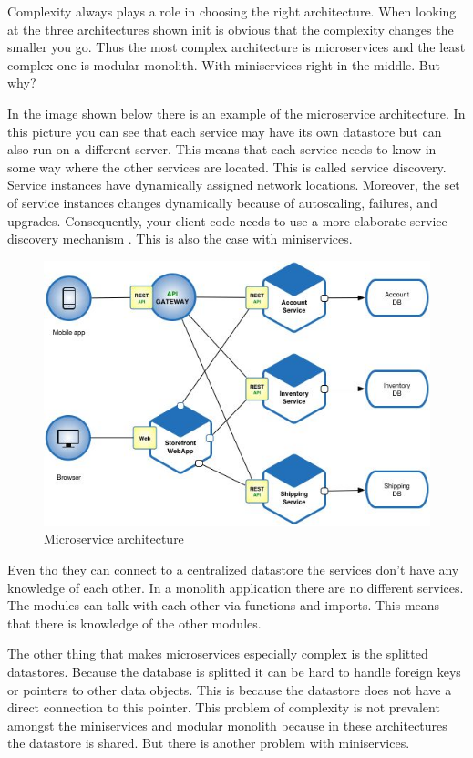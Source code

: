 Complexity always plays a role in choosing the right architecture. When looking at the three architectures shown  init is obvious that the complexity changes the smaller you go. Thus the most complex architecture is microservices and the least complex one is modular monolith. With miniservices right in the middle. But why?

In the image shown below there is an example of the microservice architecture. In this picture you can see that each service may have its own datastore but can also run on a different server. This means that each service needs to know in some way where the other services are located. This is called service discovery. Service instances have dynamically assigned network locations. Moreover, the set of service instances changes dynamically because of autoscaling, failures, and upgrades. Consequently, your client code needs to use a more elaborate service discovery mechanism \cite{serviceDiscovery}. This is also the case with miniservices.

\begin{figure}[H]
	\includegraphics[width=\linewidth]{microservice-architecture.png}
	\caption{Microservice architecture}
\end{figure}

Even tho they can connect to a centralized datastore the services don’t have any knowledge of each other. In a monolith application there are no different services. The modules can talk with each other via functions and imports. This means that there is knowledge of the other modules.

The other thing that makes microservices especially complex is the splitted datastores. Because the database is splitted it can be hard to handle foreign keys or pointers to other data objects. This is because the datastore does not have a direct connection to this pointer. This problem of complexity is not prevalent amongst the miniservices and modular monolith because in these architectures the datastore is shared. But there is another problem with miniservices.

